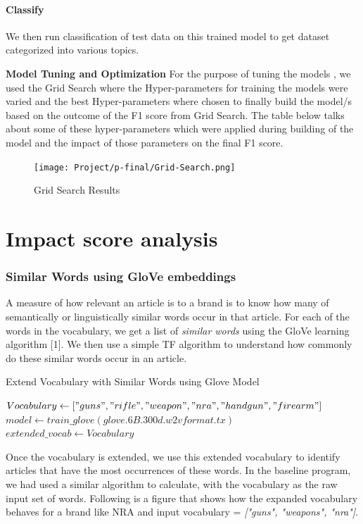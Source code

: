 \documentclass[paper=a4, fontsize=11pt]{scrartcl}
\numberwithin{equation}{section}		%
\numberwithin{figure}{section}			%
\numberwithin{table}{section}				%
\begin{document}
\paragraph{Classify} We then run classification of test data on this trained model to get dataset categorized into various topics.

\textbf{Model Tuning and Optimization}
For the purpose of tuning the models , we used the Grid Search where the Hyper-parameters for training the models were varied and the best Hyper-parameters where chosen to finally build the model/s based on the outcome of the F1 score from Grid Search.  The table below talks about some of these hyper-parameters which were applied during building of the model and the impact of those parameters on the final F1 score.   
\begin{figure}
	\centering
 	 \texttt{[image: Project/p-final/Grid-Search.png]}
	  \caption{Grid Search Results}
 	 \label{fig:Grid Search.png}
\end{figure}


\section{Impact score analysis}
\subsubsection {Similar Words using GloVe embeddings}
A measure of how relevant an article is to a brand is to know how many of semantically or linguistically similar words occur in that article. For each of the words in the vocabulary, we get a list of \textit{similar words} using the GloVe learning algorithm [1]. We then use a simple TF algorithm to understand how commonly do these similar words occur in an article.
\begin{center}
\begin{algorithm}
  \caption{Extend Vocabulary with Similar Words using Glove Model}

 $Vocabulary \gets ["guns", "rifle", "weapon", "nra", "handgun", "firearm"] $\;
 $model \gets train\_glove(\textit{glove.6B.300d.w2vformat.tx}) $\;
  {
      $extended\_vocab \gets Vocabulary $\;
    \;
  }
\end{algorithm}
\end{center}
Once the vocabulary is extended, we use this extended vocabulary to identify articles that have the most occurrences of these words. In the baseline program, we had used a similar algorithm to calculate, with the vocabulary as the raw input set of words. Following is a figure that shows how the expanded vocabulary behaves for a brand like NRA and input vocabulary = \textit {["guns", "weapons", "nra"]}.
\end{document}
